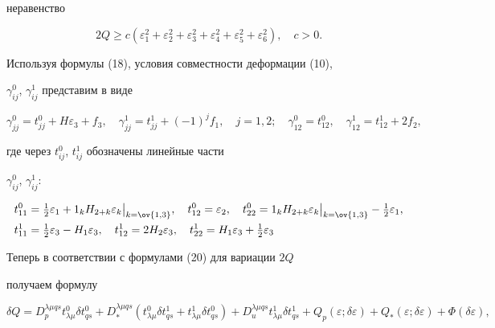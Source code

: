 неравенство 


\begin{equation} 


2Q\ge c(\varepsilon^2_1+\varepsilon^2_2+\varepsilon^2_3+ 


\varepsilon^2_4+\varepsilon^2_5+\varepsilon^2_6),\quad c>0. 


\end{equation} 


Используя формулы (18), условия совместности деформации (10), 


$\gamma^0_{ij}$, $\gamma^1_{ij}$ представим в виде 


\begin{equation} 


\gamma^0_{jj}=t^0_{jj}+H\varepsilon_3+f_3,\quad 


\gamma^1_{jj}=t^1_{jj}+(-1)^jf_1,\quad j=1,2;\quad 


\gamma^0_{12}=t^0_{12},\quad \gamma^1_{12}=t^1_{12}+2f_2, 


\end{equation} 


где через $t^0_{ij}$, $t^1_{ij}$ обозначены линейные части 


$\gamma^0_{ij}$, $\gamma^1_{ij}$: 


\begin{equation} 


\begin{split} 


t^0_{11}&=\tfrac{1}{2}\varepsilon_1+1_kH_{2+k} 


\varepsilon_k\big|_{k=\ov{1,3}},\quad t^0_{12}= 


\varepsilon_2,\quad t^0_{22}=1_kH_{2+k} 


\varepsilon_k\big|_{k=\ov{1,3}}-\tfrac{1}{2}\varepsilon_1, \\ 


t^1_{11}&=\tfrac{1}{2}\varepsilon_3-H_1\varepsilon_3,\quad 


t^1_{12}=2H_2\varepsilon_3,\quad 


t^1_{22}=H_1\varepsilon_3+\tfrac{1}{2}\varepsilon_3 


\end{split} 


\end{equation} 


Теперь в соответствии с формулами (20) для вариации $2Q$ 


получаем формулу 


\begin{equation} 


\delta Q=D^{\lambda\mu q s}_p t^0_{\lambda\mu}\delta t^0_{qs} 


+D^{\lambda\mu qs}_*(t^0_{\lambda\mu} 


\delta t^1_{qs}+t^1_{\lambda\mu}\delta t^0_{qs})+ 


D^{\lambda\mu qs}_u t^1_{\lambda\mu}\delta t^1_{qs} 


+Q_p(\varepsilon;\delta\varepsilon)+Q_*(\varepsilon;\delta\varepsilon) 


+\Phi(\delta\varepsilon), 


\end{equation} 


